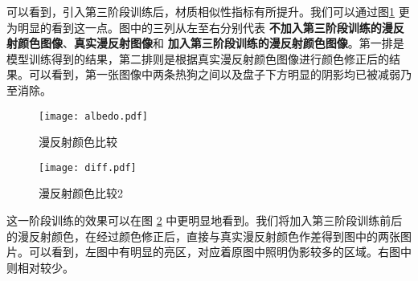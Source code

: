\newpage
可以看到，引入第三阶段训练后，材质相似性指标有所提升。我们可以通过图\ref{fig:albedo} 更为明显的看到这一点。图中的三列从左至右分别代表 \textbf{不加入第三阶段训练的漫反射颜色图像}、\textbf{真实漫反射图像}和 \textbf{加入第三阶段训练的漫反射颜色图像}。第一排是模型训练得到的结果，第二排则是根据真实漫反射颜色图像进行颜色修正后的结果。可以看到，第一张图像中两条热狗之间以及盘子下方明显的阴影均已被减弱乃至消除。
\begin{figure}
  \centering
  \texttt{[image: albedo.pdf]}
  \caption{漫反射颜色比较}
  \label{fig:albedo}
\end{figure}

\begin{figure}[h]
  \centering
  \texttt{[image: diff.pdf]}
  \caption{漫反射颜色比较2}
  \label{fig:diff}
\end{figure}

这一阶段训练的效果可以在图 \ref{fig:diff} 中更明显地看到。我们将加入第三阶段训练前后的漫反射颜色，在经过颜色修正后，直接与真实漫反射颜色作差得到图中的两张图片。可以看到，左图中有明显的亮区，对应着原图中照明伪影较多的区域。右图中则相对较少。
